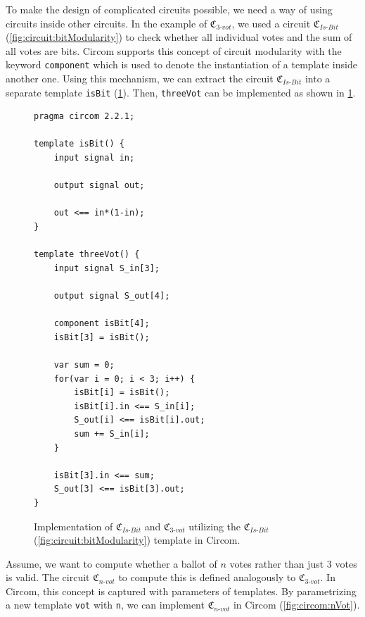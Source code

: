 To make the design of complicated circuits possible, we need a way of using circuits inside other circuits.
In the example of $\mathfrak{C}_{3\text{-}vot}$, we used a circuit $\mathfrak{C}_{Is\text{-}Bit}$ (\cref{fig:circuit:bitModularity}) to check whether all individual votes and the sum of all votes are bits.
Circom supports this concept of circuit modularity with the keyword \verb|component| which is used to denote the instantiation of a template inside another one.
Using this mechanism, we can extract the circuit $\mathfrak{C}_{Is\text{-}Bit}$ into a separate template \verb|isBit| (\cref{fig:circom:threeVotIsBit}).
Then, \verb|threeVot| can be implemented as shown in \cref{fig:circom:threeVotIsBit}.

\begin{figure}[h]
    \centering
    \captionsetup{type=listing}
    \begin{lstlisting}[language=Circom]
pragma circom 2.2.1;

template isBit() {
    input signal in;

    output signal out;

    out <== in*(1-in);
}

template threeVot() {
    input signal S_in[3];

    output signal S_out[4];

    component isBit[4];
    isBit[3] = isBit();

    var sum = 0;
    for(var i = 0; i < 3; i++) {
        isBit[i] = isBit();
        isBit[i].in <== S_in[i];
        S_out[i] <== isBit[i].out;
        sum += S_in[i];
    }

    isBit[3].in <== sum;
    S_out[3] <== isBit[3].out;
}\end{lstlisting}
    \caption{Implementation of $\mathfrak{C}_{Is\text{-}Bit}$ and $\mathfrak{C}_{3\text{-}vot}$ utilizing the $\mathfrak{C}_{Is\text{-}Bit}$ (\cref{fig:circuit:bitModularity}) template in Circom.}
    \label{fig:circom:threeVotIsBit}
\end{figure}


Assume, we want to compute whether a ballot of $n$ votes rather than just $3$ votes is valid.
The circuit $\mathfrak{C}_{n\text{-}vot}$ to compute this is defined analogously to $\mathfrak{C}_{3\text{-}vot}$.
In Circom, this concept is captured with parameters of templates.
By parametrizing a new template \verb|vot| with \verb|n|, we can implement $\mathfrak{C}_{n\text{-}vot}$ in Circom (\cref{fig:circom:nVot}).

